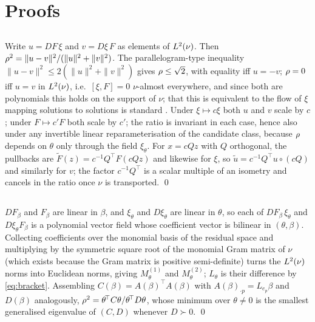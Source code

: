 \section{Proofs}
\label{app:proofs}

\subsection*{}
Write $u = DF\,\xi$ and $v = D\xi\,F$ as elements of $L^2(\nu)$. Then
$\rho^2 = \|u-v\|^2/(\|u\|^2+\|v\|^2)$. The parallelogram-type inequality
$\|u-v\|^2 \le 2(\|u\|^2+\|v\|^2)$ gives $\rho \le \sqrt 2$, with equality
iff $u = -v$; $\rho = 0$ iff $u = v$ in $L^2(\nu)$, i.e.\ $[\xi,F]=0$
$\nu$-almost everywhere, and since both are polynomials this holds on the
support of $\nu$; that this is equivalent to the flow of $\xi$ mapping solutions
to solutions is standard \citep[Ch.~9]{lee2013smooth}. Under
$\xi \mapsto c\xi$ both $u$ and $v$ scale by $c$; under
$F \mapsto c'F$ both scale by $c'$; the ratio is invariant in each case, hence
also under any invertible linear reparameterisation of the candidate class,
because $\rho$ depends on $\theta$ only through the field $\xi_\theta$.
For $x = cQz$ with $Q$ orthogonal, the pullbacks are
$\tilde F(z) = c^{-1}Q^{\!\top}F(cQz)$ and likewise for $\xi$, so
$\tilde u = c^{-1}Q^{\!\top}u \circ (cQ)$ and similarly for $v$; the factor
$c^{-1}Q^{\!\top}$ is a scalar multiple of an isometry and cancels in the
ratio once $\nu$ is transported. \qed

\subsection*{}
$DF_\beta$ and $F_\beta$ are linear in $\beta$, and $\xi_\theta$ and
$D\xi_\theta$ are linear in $\theta$, so each of $DF_\beta\,\xi_\theta$ and
$D\xi_\theta F_\beta$ is a polynomial vector field whose coefficient vector is
bilinear in $(\theta,\beta)$. Collecting coefficients over the monomial basis of
the residual space and multiplying by the symmetric square root of the monomial
Gram matrix of $\nu$ (which exists because the Gram matrix is positive
semi-definite) turns the $L^2(\nu)$ norms into Euclidean norms, giving
$M^{(1)}_\theta$ and $M^{(2)}_\theta$; $L_\theta$ is their difference by
\eqref{eq:bracket}. Assembling $C(\beta) = A(\beta)^{\!\top}A(\beta)$ with
$A(\beta)_{\cdot p} = L_{e_p}\beta$ and $D(\beta)$ analogously,
$\rho^2 = \theta^{\!\top}C\theta / \theta^{\!\top}D\theta$, whose minimum
over $\theta \ne 0$ is the smallest generalised eigenvalue of $(C,D)$ whenever
$D \succ 0$. \qed

